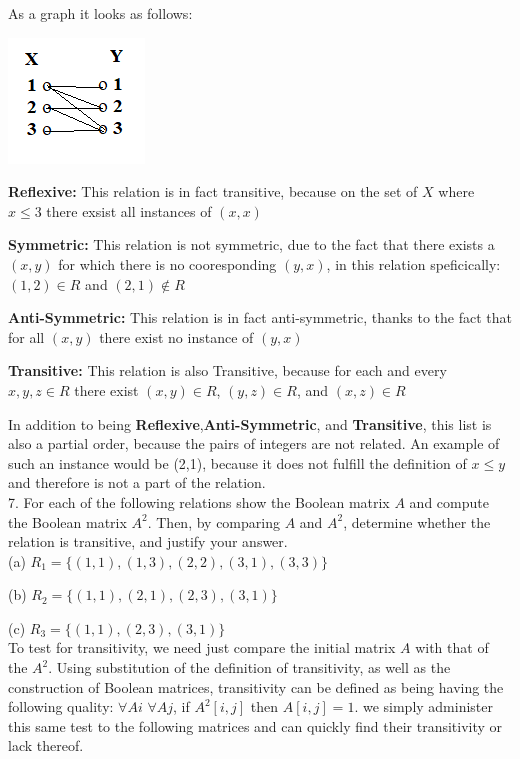 \documentclass[10pt]{article}
\begin{document}
As a graph it looks as follows:

\center
\includegraphics{6c}
\flushleft

\textbf{Reflexive:} This relation is in fact transitive, because on the set of $X$ where $x\leq3$ there exsist all instances of $(x,x)$

\textbf{Symmetric:} This relation is not symmetric, due to the fact that there exists a $(x,y)$ for which there is no cooresponding $(y,x)$, in this relation speficically: $(1,2) \in R$ and $(2,1) \notin R$

\textbf{Anti-Symmetric:} This relation is in fact anti-symmetric, thanks to the fact that for all $(x,y)$ there exist no instance of $(y,x)$

\textbf{Transitive:} This relation is also Transitive, because for each and every $x,y,z \in R$ there exist $(x,y) \in R$, $(y,z) \in R$, and $(x,z) \in R$  

In addition to being \textbf{Reflexive},\textbf{Anti-Symmetric}, and \textbf{Transitive}, this list is also a partial order, because the pairs of integers are not related.  An example of such an instance would be (2,1), because it does not fulfill the definition of $x \leq y$ and therefore is not a part of the relation.\\

7. For each of the following relations show the Boolean matrix $A$ and compute the Boolean matrix $A^2$.  Then, by comparing $A$ and $A^2$, determine whether the relation is transitive, and justify your answer.\\

(a) $R_1 = \{(1,1),(1,3),(2,2),(3,1),(3,3)\}$

(b) $R_2 = \{(1,1),(2,1),(2,3),(3,1)\}$

(c) $R_3 = \{(1,1),(2,3),(3,1)\}$\\

To test for transitivity, we need just compare the initial matrix $A$ with that of the $A^2$.  Using substitution of the definition of transitivity, as well as the construction of Boolean matrices, transitivity can be defined as being having the following quality: $\forall Ai$  $\forall Aj$, if $A^2[i,j]$  then $A[i,j] = 1$.  we simply administer this same test to the following matrices and can quickly find their transitivity or lack thereof.
\end{document}
